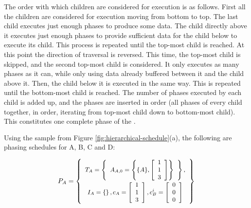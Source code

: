The order with which children are considered for execution is as
follows.  First all the children are considered for execution
moving from bottom to top.  The last child executes just enough
phases to produce some data.  The child directly above it executes
just enough phases to provide sufficient data for the child below
to execute its child.  This process is repeated until the top-most
child is reached.  At this point the direction of traversal is
reversed. This time, the top-most child is skipped, and the second
top-most child is considered.  It only executes as many phases as
it can, while only using data already buffered between it and the
child above it. Then, the child below it is executed in the same
way. This is repeated until the bottom-most child is reached. The
number of phases executed by each child is added up, and the
phases are inserted in order (all phases of every child together,
in order, iterating from top-most child down to bottom-most
child).  This constitutes one complete phase of the {\pipeline}.

Using the sample {\pipeline} from Figure
\ref{fig:hierarchical-schedule}(a), the following are phasing
schedules for {\filters} A, B, C and D:

\begin{displaymath} \small
P_A = \left\{
\begin{array}{c}
T_A = \left\{
\begin{array}{c}
A_{A,0} = \left\{ \{A\}, \left[\begin{array}{c} 1 \\ 1 \\ 3 \end{array}\right]\right\} \\
\end{array}\right\}, \\
I_A = \left\{ \right\},  c_A = \left[ \begin{array}{c} 1 \\ 1 \\
3 \end{array} \right], c^i_B = \left[ \begin{array}{c} 0 \\ 0 \\ 0
\end{array} \right]
\end{array}
\right\}
\end{displaymath}

